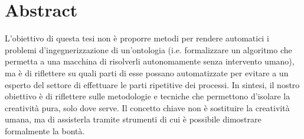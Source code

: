 \chapter*{Abstract}

L'obiettivo di questa tesi non è proporre metodi per rendere automatici i problemi d'ingegnerizzazione di un'ontologia (i.e. formalizzare un algoritmo che permetta a una macchina di risolverli autonomamente senza intervento umano), ma è di riflettere su quali parti di esse possano automatizzate per evitare a un esperto del settore di effettuare le parti ripetitive dei processi. In sintesi, il nostro obiettivo è di riflettere sulle metodologie e tecniche che permettono d'isolare la creatività pura, solo dove serve. Il concetto chiave non è sostituire la creatività umana, ma di assisterla tramite strumenti di cui è possibile dimostrare formalmente la bontà.
